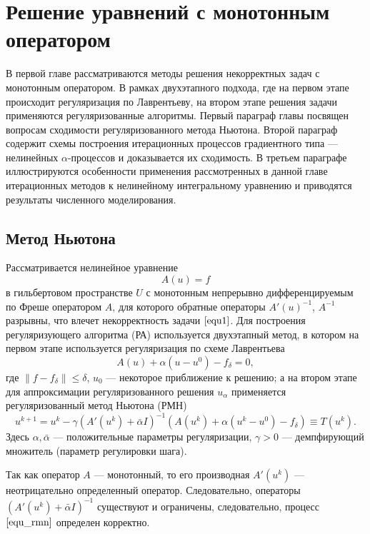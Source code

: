 \chapter{Решение уравнений с монотонным оператором}
В первой главе рассматриваются методы решения некорректных задач с монотонным оператором. В рамках двухэтапного подхода, где на первом этапе происходит регуляризация по Лаврентьеву, на втором этапе решения задачи применяются регуляризованные алгоритмы. Первый параграф главы посвящен вопросам сходимости регуляризованного метода Ньютона. Второй параграф содержит схемы построения итерационных процессов градиентного типа --- нелинейных $\alpha$-процессов и доказывается их сходимость. В третьем параграфе иллюстрируются особенности применения рассмотренных в данной главе итерационных методов к нелинейному интегральному уравнению и приводятся результаты численного моделирования.

\newpage
\section{Метод Ньютона}
Рассматривается нелинейное уравнение
\begin{equation}\label{equ1}A(u)=f\end{equation}
в гильбертовом пространстве $U$ с монотонным непрерывно дифференцируемым по Фреше оператором $A$, для которого обратные операторы $A'(u)^{-1}$, $A^{-1}$ разрывны, что влечет некорректность задачи $\eqref{equ1}$. Для построения регуляризующего алгоритма (РА) используется двухэтапный метод, в котором на первом этапе используется регуляризация по схеме Лаврентьева
\begin{equation}\label{equ2}A(u)+\alpha(u-u^0)-f_\delta=0,\end{equation}
где $\|f-f_\delta\|\le\delta$, $u_0$ --- некоторое приближение к решению; а на втором этапе для аппроксимации регуляризованного решения $u_\alpha$ применяется регуляризованный метод Ньютона (РМН)
\begin{equation}\label{equ_rmn}
u^{k+1}=u^k-\gamma(A'(u^k)+\bar\alpha I)^{-1}(A(u^k)+\alpha(u^k-u^0)-f_\delta)\equiv{T(u^k)}.
\end{equation}
Здесь $\alpha, \bar\alpha$ --- положительные параметры регуляризации, $\gamma>0$ --- демпфирующий множитель (параметр регулировки шага).

Так как оператор $A$ --- монотонный, то его производная $A'(u^k)$ --- неотрицательно определенный оператор. Следовательно, операторы $(A'(u^k)+\bar\alpha I)^{-1}$ существуют и ограничены, следовательно, процесс $\eqref{equ_rmn}$ определен корректно.

